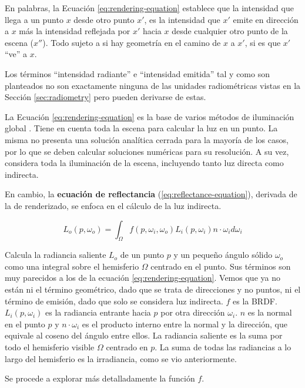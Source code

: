 En palabras, la Ecuación \ref{eq:rendering-equation} establece que la intensidad que llega a un punto $x$ desde otro punto $x'$, es la intensidad que $x'$ emite en dirección a $x$ más la intensidad reflejada por $x'$ hacia $x$ desde cualquier otro punto de la escena ($x''$).
Todo sujeto a si hay geometría en el camino de $x$ a $x'$, si es que $x'$ ``ve'' a $x$.

Los términos ``intensidad radiante'' e ``intensidad emitida'' tal y como son planteados no son exactamente ninguna de las unidades radiométricas vistas en la Sección \ref{sec:radiometry} pero pueden derivarse de estas.

La Ecuación \ref{eq:rendering-equation} es la base de varios métodos de iluminación global \cite[p.~437]{rtr}.
Tiene en cuenta toda la escena para calcular la luz en un punto.
La misma no presenta una solución analítica cerrada para la mayoría de los casos, por lo que se deben calcular soluciones numéricas para su resolución.
A su vez, considera toda la iluminación de la escena, incluyendo tanto luz directa como indirecta.

En cambio, la \textbf{ecuación de reflectancia} (\ref{eq:reflectance-equation}), derivada de la de renderizado, se enfoca en el cálculo de la luz indirecta.

\begin{equation}\label{eq:reflectance-equation}
    L_o(p, \omega_o) = \int_{\Omega}{f(p, \omega_i, \omega_o) L_i(p, \omega_i) n \cdot \omega_i d\omega_i}
\end{equation}

Calcula la radiancia saliente $L_o$ de un punto $p$ y un pequeño ángulo sólido $\omega_o$ como una integral sobre el hemisferio $\Omega$ centrado en el punto.
Sus términos son muy parecidos a los de la ecuación \ref{eq:rendering-equation}.
Vemos que ya no están ni el término geométrico, dado que se trata de direcciones y no puntos, ni el término de emisión, dado que solo se considera luz indirecta.
$f$ es la BRDF.
$L_i(p, \omega_i)$ es la radiancia entrante hacia $p$ por otra dirección $\omega_i$.
$n$ es la normal en el punto $p$ y $n \cdot \omega_i$ es el producto interno entre la normal y la dirección, que equivale al coseno del ángulo entre ellos.
La radiancia saliente es la suma por todo el hemisferio visible $\Omega$ centrado en $p$.
La suma de todas las radiancias a lo largo del hemisferio es la irradiancia, como se vio anteriormente.

Se procede a explorar más detalladamente la función $f$.

